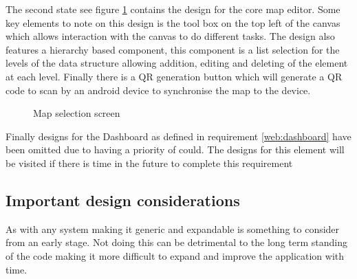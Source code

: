 The second state see figure \ref{fig:webappmapeditor} contains the design for the core map editor. Some key elements to note on this design is the tool box on the top left of the canvas which allows interaction with the canvas to do different tasks. The design also features a hierarchy based component, this component is a list selection for the levels of the data structure allowing addition, editing and deleting of the element at each level. Finally there is a QR generation button which will generate a QR code to scan by an android device to synchronise the map to the device.
\begin{figure}[h]
	\centering
	\caption{Map selection screen}
	\label{fig:webappmapeditor}
\end{figure}

Finally designs for the Dashboard as defined in requirement \ref{web:dashboard} have been omitted due to having a priority of could. The designs for this element will be visited if there is time in the future to complete this requirement
\pagebreak
\subsection{Important design considerations}
As with any system making it generic and expandable is something to consider from an early stage. Not doing this can be detrimental to the long term standing of the code making it more difficult to expand and improve the application with time.

